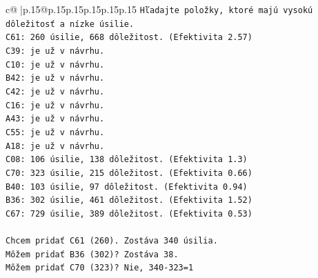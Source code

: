 \documentclass{article}
\begin{document}
{\begin{supertabular}{c@{$\;$}|p{.15\linewidth}@{}p{.15\linewidth}p{.15\linewidth}p{.15\linewidth}p{.15\linewidth}p{.15\linewidth}}
{{{\texttt{Hľadajte položky, ktoré majú vysokú dôležitosť a nízke úsilie.} \\
\texttt{C61: 260 úsilie, 668 dôležitost. (Efektivita 2.57)} \\
\texttt{C39: je už v návrhu.} \\
\texttt{C10: je už v návrhu.} \\
\texttt{B42: je už v návrhu.} \\
\texttt{C42: je už v návrhu.} \\
\texttt{C16: je už v návrhu.} \\
\texttt{A43: je už v návrhu.} \\
\texttt{C55: je už v návrhu.} \\
\texttt{A18: je už v návrhu.} \\
\texttt{C08: 106 úsilie, 138 dôležitost. (Efektivita 1.3)} \\
\texttt{C70: 323 úsilie, 215 dôležitost. (Efektivita 0.66)} \\
\texttt{B40: 103 úsilie, 97 dôležitost. (Efektivita 0.94)} \\
\texttt{B36: 302 úsilie, 461 dôležitost. (Efektivita 1.52)} \\
\texttt{C67: 729 úsilie, 389 dôležitost. (Efektivita 0.53)} \\
\\ 
\texttt{Chcem pridať C61 (260). Zostáva 340 úsilia.} \\
\texttt{Môžem pridať B36 (302)? Zostáva 38.} \\
\texttt{Môžem pridať C70 (323)? Nie, 340{-}323=1} \\
            }
        }
    }
     \\ \\


\end{supertabular}}
\end{document}
